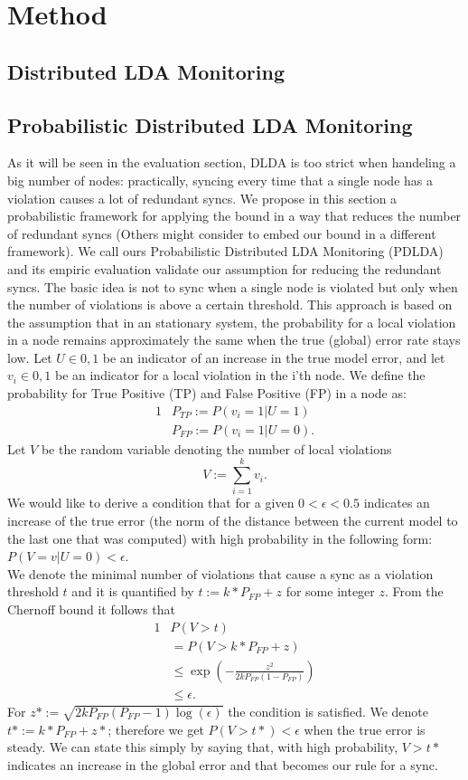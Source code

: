 \documentclass[11pt,twocolumn,varwidth=true,a4paper,fleqn]{article}
\begin{document}
\section{Method}
\subsection{Distributed LDA Monitoring}

\subsection{Probabilistic Distributed LDA Monitoring}
As it will be seen in the evaluation section, DLDA is too strict when handeling
a big number of nodes: practically, syncing every time that a single node
has a violation causes a lot of redundant syncs.
We propose in this section a probabilistic framework for applying the
bound in a way that reduces the number of redundant syncs (Others might consider
to embed our bound in a different framework). 
We call ours Probabilistic Distributed LDA Monitoring (PDLDA) and its
empiric evaluation validate our assumption for reducing the redundant syncs.
The basic idea is not to sync when a single node is violated but only 
when the number of violations is above a certain threshold. 
This approach is based on the assumption that in an stationary system, 
the probability for a local violation in a node remains approximately the same
when the true (global) error rate stays low. 
Let $U \in {0,1}$ be an indicator of an increase in the true model error,
and let $v_i \in {0,1}$ be an indicator for a local violation in the
i'th node. We define the probability for True Positive (TP) and False Positive
(FP) in a node as:
\begin{alignat*}{1}
& P_{TP} := P(v_i=1 | U=1) \\
& P_{FP} := P(v_i=1 | U=0).
\end{alignat*}
Let $V$ be the random variable denoting the number of local violations
\begin{equation*}
V := \sum_{i=1}^k v_i.
\end{equation*}
We would like to derive a condition that for a given $0 < \epsilon < 0.5$
indicates an increase of the true error (the norm of
the distance between the current model to the last one that was computed) 
with high probability in the following form:
$P(V=v|U=0) < \epsilon$.
\\We denote the minimal number of violations that cause a sync as a violation
threshold $t$ and it is quantified by $t:=k*P_{FP}+z$ for some integer $z$.
From the Chernoff bound it follows that 
\begin{alignat*}{1}
& P(V>t) \\
& = P(V>k*P_{FP}+z) \\
& \leq \exp(-\frac{z^2}{2kP_{FP}(1-P_{FP})}) \\
& \leq \epsilon.
\end{alignat*}
For $z*:=\sqrt{2kP_{FP}(P_{FP}-1)\log(\epsilon)}$ the condition is satisfied. 
We denote $t*:=k*P_{FP}+z*$; therefore we get $P(V > t*) <
\epsilon$ when the true error is steady.
We can state this simply by saying that, with high probability, $V > t*$
indicates an increase in the global error and that becomes our rule for a
sync.
\end{document}
